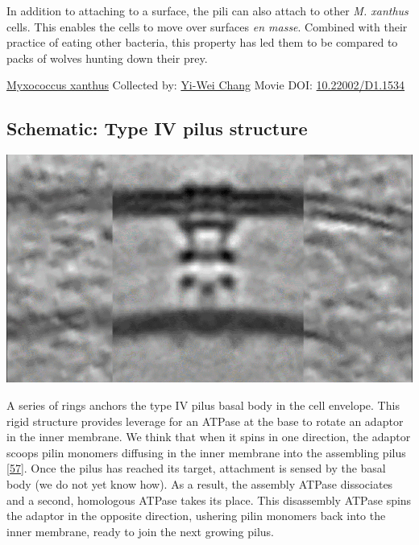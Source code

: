 \documentclass[]{tufte-book}
\begin{document}
In addition to attaching to a surface, the pili can also attach to other \emph{M. xanthus} cells. This enables the cells to move over surfaces \emph{en masse}. Combined with their practice of eating other bacteria, this property has led them to be compared to packs of wolves hunting down their prey.



\hypertarget{htmlwidget-7f60d03bb151731c6b90}{}

\label{fig:6-10}\protect\hyperlink{tree}{Myxococcus xanthus} Collected by: \protect\hyperlink{yi-wei_chang}{Yi-Wei Chang} Movie DOI: \href{https://doi.org/10.22002/D1.1534}{10.22002/D1.1534}

\hypertarget{Type_IV_pilus_structure}{%
\subsection*{Schematic: Type IV pilus structure}\label{Type_IV_pilus_structure}}

\includegraphics{img/schematics/6_10_1}

A series of rings anchors the type IV pilus basal body in the cell envelope. This rigid structure provides leverage for an ATPase at the base to rotate an adaptor in the inner membrane. We think that when it spins in one direction, the adaptor scoops pilin monomers diffusing in the inner membrane into the assembling pilus {[}\protect\hyperlink{ref-chang2016}{57}{]}. Once the pilus has reached its target, attachment is sensed by the basal body (we do not yet know how). As a result, the assembly ATPase dissociates and a second, homologous ATPase takes its place. This disassembly ATPase spins the adaptor in the opposite direction, ushering pilin monomers back into the inner membrane, ready to join the next growing pilus.
\end{document}

